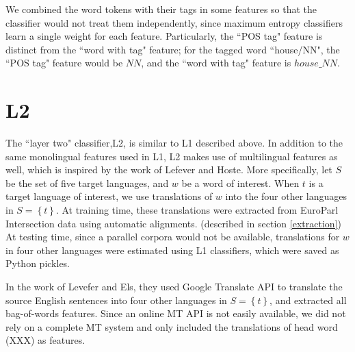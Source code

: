 \documentclass[11pt,letterpaper]{article}
\begin{document}
We combined the word tokens with their tags in some features so that the
classifier would not treat them independently, since maximum entropy
classifiers learn a single weight for each feature.
Particularly, the ``POS tag" feature is distinct from the ``word with tag"
feature; for the tagged word ``house/NN", the ``POS tag" feature would be $NN$, and
the ``word with tag" feature is $house\_NN$. 


\section{L2}

The ``layer two" classifier,L2, is similar to L1 described above. In addition to the same monolingual features used in L1, L2 makes use of 
multilingual features as well, which is inspired by the work of Lefever and Hoste.
More specifically, let $S$ be the set of five target languages, and $w$ be a word of interest. When $t$ is a target language of interest, we use translations of $w$ into the four other languages in 
$ S = \left\lbrace t \right\rbrace $.
At training time, these translations were extracted from EuroParl Intersection data using automatic alignments. (described in section \ref{extraction})
At testing time, since a parallel corpora would not be available, translations for $w$ in four other languages were estimated using L1 classifiers, which were saved as Python pickles.

In the work of Levefer and Els, they used Google Translate API to translate the source English sentences into four other languages in $ S = \left\lbrace t \right\rbrace$, and extracted all bag-of-words features. Since an online MT API is not easily available, we did not rely on a complete MT system and only included the translations of head word (XXX) as features.




\end{document}
